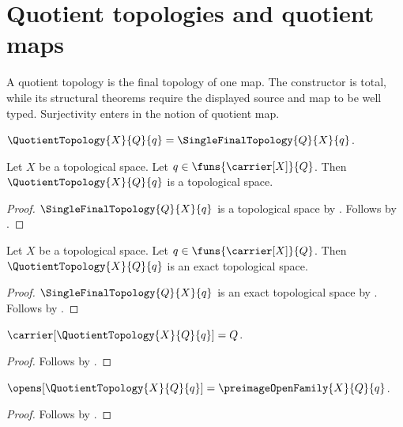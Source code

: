 \section{Quotient topologies and quotient maps}



A quotient topology is the final topology of one map.  The constructor is
total, while its structural theorems require the displayed source and map to
be well typed.  Surjectivity enters in the notion of quotient map.

\begin{definition}\label{quotient_topology}
    $\QuotientTopology{X}{Q}{q}=\SingleFinalTopology{Q}{X}{q}$.
\end{definition}

\begin{theorem}\label{quotient_topology_is_topological_space}
    Let $X$ be a topological space.
    Let $q\in\funs{\carrier[X]}{Q}$.
    Then $\QuotientTopology{X}{Q}{q}$ is a topological space.
\end{theorem}
\begin{proof}
    $\SingleFinalTopology{Q}{X}{q}$ is a topological space by
        .
    Follows by .
\end{proof}

\begin{theorem}\label{quotient_topology_is_exact}
    Let $X$ be a topological space.
    Let $q\in\funs{\carrier[X]}{Q}$.
    Then $\QuotientTopology{X}{Q}{q}$ is an exact topological space.
\end{theorem}
\begin{proof}
    $\SingleFinalTopology{Q}{X}{q}$ is an exact topological space by
        .
    Follows by .
\end{proof}

\begin{proposition}\label{quotient_topology_carrier}
    $\carrier[\QuotientTopology{X}{Q}{q}]=Q$.
\end{proposition}
\begin{proof}
    Follows by
        .
\end{proof}

\begin{proposition}\label{quotient_topology_opens}
    $\opens[\QuotientTopology{X}{Q}{q}]
        =\preimageOpenFamily{X}{Q}{q}$.
\end{proposition}
\begin{proof}
    Follows by
        .
\end{proof}

